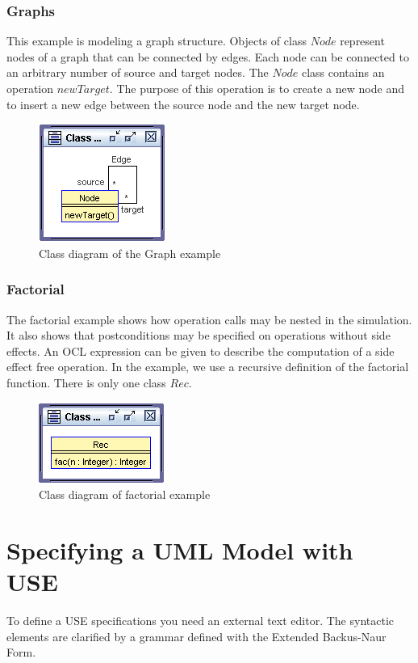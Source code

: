 \documentclass[a4paper,titlepage,oneside,final]{scrreprt} %
\begin{document}
\subsection{Graphs}\label{graphsExample}
This example is modeling a graph structure.
Objects of class $\mathit{Node}$ represent nodes of a graph
that can be connected by edges. Each node can be
connected to an arbitrary number of source and target nodes.
The $\mathit{Node}$ class contains an operation $\mathit{newTarget}$. The purpose of this
operation is to create a new node and to insert a new edge
between the source node and the new target node.
\begin{figure}[ht]
\centering
\includegraphics[scale=0.7]{Pictures/GraphClassDiagram.png}
\caption{Class diagram of the Graph example}
\label{fig:GraphClassDiagram}
\end{figure}
\subsection{Factorial}\label{factorialExample}
The factorial example shows how operation calls may be nested in the simulation.
It also shows that postconditions may be specified on operations
without side effects. An OCL expression can be given to describe
the computation of a side effect free operation. In the example,
we use a recursive definition of the factorial function.
There is only one class $\mathit{Rec}$.
\begin{figure}[ht]
\centering
\includegraphics[scale=0.7]{Pictures/NestedClassDiagram.png}
\caption{Class diagram of factorial example}
\label{fig:FactorialClassDiagram}
\end{figure}
\chapter{Specifying a UML Model with USE}\label{SpecWithUSE}
To define a USE specifications you need an external text editor.
The syntactic elements are clarified by a grammar defined with the Extended Backus-Naur Form.
\end{document}
